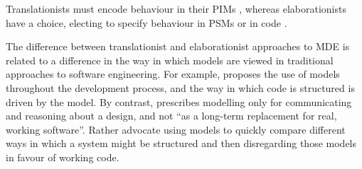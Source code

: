 Translationists must encode behaviour in their PIMs \cite{mellor02executable}, whereas elaborationists have a choice, electing to specify behaviour in PSMs or in code \cite{kleppe03mda}.

The difference between translationist and elaborationist approaches to MDE is related to a difference in the way in which models are viewed in traditional approaches to software engineering. For example, \cite{evans04domain} proposes the use of models throughout the development process, and the way in which code is structured is driven by the model. By contrast, \cite[ch. 14]{martin06agile} prescribes modelling only for communicating and reasoning about a design, and not ``as a long-term replacement for real, working software''. Rather \cite{martin06agile} advocate using models to quickly compare different ways in which a system might be structured and then disregarding those models in favour of working code.

